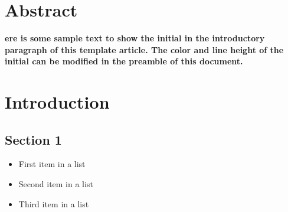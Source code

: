 %
%
%
%






\begin{titlepage}
  \thispagestyle{empty}
  \maketitle %
\end{titlepage}


\tableofcontents

\chapter{Abstract}
\textbf{ere is some sample text to show the initial in the introductory paragraph of this template article. The color and line height of the initial can be modified in the preamble of this document.}


\chapter{Introduction}



\section{Section 1}


\begin{itemize}
  \item First item in a list 
  \item Second item in a list 
  \item Third item in a list
\end{itemize}


